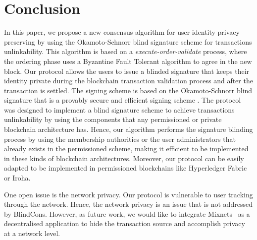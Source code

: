 \documentclass[conference]{llncs}
\newcommand{\name}{BlindCons}
\begin{document}
\section{Conclusion} \label{conclu}
In this paper, we propose a new consensus algorithm for user identity privacy preserving by using the Okamoto-Schnorr blind signature scheme for transactions unlinkability. This algorithm is based on a \emph{execute-order-validate} process, where the ordering phase uses a Byzantine Fault Tolerant algorithm to agree in the new block. Our protocol allows the users to issue a blinded signature that keeps their identity private during the blockchain transaction validation process and after the transaction is settled. The signing scheme is based on the Okamoto-Schnorr blind signature that is a provably secure \cite{pointcheval1996provably} and efficient signing scheme \cite{schnorr1991efficient}. The protocol was designed to implement a blind signature scheme to achieve transactions unlinkability by using the components that any permissioned or private blockchain architecture has. Hence, our algorithm performs the signature blinding process by using the membership authorities or the user administrators that already exists in the permissioned scheme, making it efficient to be implemented in these kinds of blockchain architectures. Moreover, our protocol can be easily adapted to be implemented in permissioned blockchains like Hyperledger Fabric or Iroha.

One open issue is the network privacy. Our protocol is vulnerable to user tracking through the network. Hence, the network privacy is an issue that is not addressed by \name{}. However, as future work, we would like to integrate Mixnets~\cite{Chaum:1981:UEM:358549.358563} as a decentralised application to hide the transaction source and accomplish privacy at a network level.



\end{document}
